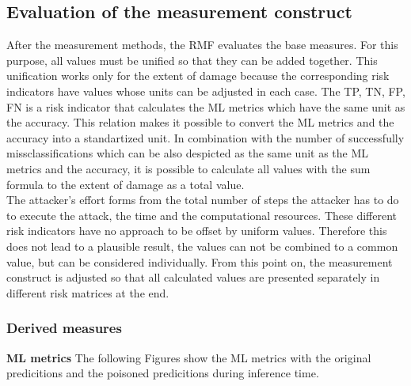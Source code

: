 \subsection{Evaluation of the measurement construct}

After the measurement methods, the RMF evaluates the base measures. For this purpose, all values must be unified so that they can be added together. This unification works only for the extent of damage because the corresponding risk indicators have values whose units can be adjusted in each case. The TP, TN, FP, FN is a risk indicator that calculates the ML metrics which have the same unit as the accuracy. This relation makes it possible to convert the ML metrics and the accuracy into a standartized unit. In combination with the number of successfully missclassifications which can be also despicted as the same unit as the ML metrics and the accuracy, it is possible to calculate all values with the sum formula to the extent of damage as a total value. \\
The attacker's effort forms from the total number of steps the attacker has to do to execute the attack, the time and the computational resources. These different risk indicators have no approach to be offset by uniform values. Therefore this does not lead to a plausible result, the values can not be combined to a common value, but can be considered individually. From this point on, the measurement construct is adjusted so that all calculated values are presented separately in different risk matrices at the end.

\subsubsection*{Derived measures}

\textbf{ML metrics} The following Figures show the ML metrics with the original predicitions and the poisoned predicitions during inference time.


